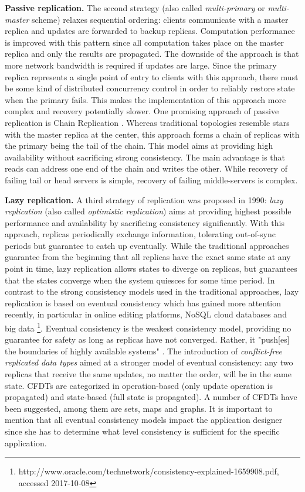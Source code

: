 \textbf{Passive replication.} The second strategy (also called \textit{multi-primary} or \textit{multi-master} scheme) relaxes sequential ordering: clients communicate with a master replica and updates are forwarded to backup replicas. Computation performance is improved with this pattern since all computation takes place on the master replica and only the results are propagated. The downside of the approach is that more network bandwidth is required if updates are large. Since the primary replica represents a single point of entry to clients with this approach, there must be some kind of distributed concurrency control in order to reliably restore state when the primary fails. This makes the implementation of this approach more complex and recovery potentially slower. One promising approach of passive replication is Chain Replication \cite{VanRenesse:2004}. Whereas traditional topologies resemble stars with the master replica at the center, this approach forms a chain of replicas with the primary being the tail of the chain. This model aims at providing high availability without sacrificing strong consistency. The main advantage is that reads can address one end of the chain and writes the other. While recovery of failing tail or head servers is simple, recovery of failing middle-servers is complex.

\textbf{Lazy replication.} A third strategy of replication was proposed in 1990: \textit{lazy replication} \cite{Ladin:1990,Ladin:1992} (also called \textit{optimistic replication}) aims at providing highest possible performance and availability by sacrificing consistency significantly. With this approach, replicas periodically exchange information, tolerating out-of-sync periods but guarantee to catch up eventually. While the traditional approaches guarantee from the beginning that all replicas have the exact same state at any point in time, lazy replication allows states to diverge on replicas, but guarantees that the states converge when the system quiesces for some time period. In contrast to the strong consistency models used in the traditional approaches, lazy replication is based on eventual consistency which has gained more attention recently, in particular in online editing platforms, NoSQL cloud databases and big data \footnote{http://www.oracle.com/technetwork/consistency-explained-1659908.pdf, accessed 2017-10-08}. Eventual consistency is the weakest consistency model, providing no guarantee for safety as long as replicas have not converged. Rather, it "push[es] the boundaries of highly available systems" \cite{Bailis:2013}. The introduction of \textit{conflict-free replicated data types} \cite{Shapiro:2011} aimed at a stronger model of eventual consistency: any two replicas that receive the same updates, no matter the order, will be in the same state. CFDTs are categorized in operation-based (only update operation is propagated) and state-based (full state is propagated). A number of CFDTs have been suggested, among them are sets, maps and graphs. It is important to mention that all eventual consistency models impact the application designer since she has to determine what level consistency is sufficient for the specific application.



